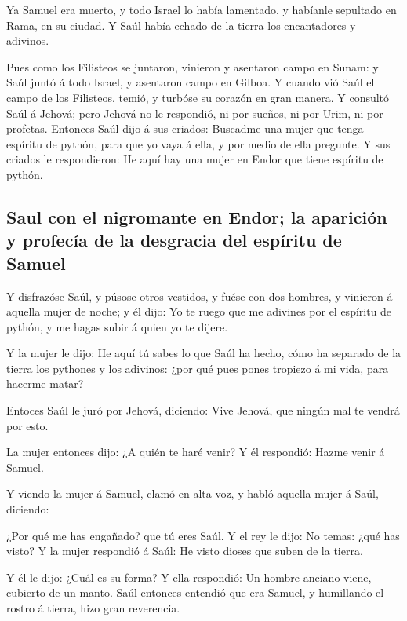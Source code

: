  Ya Samuel era muerto, y todo Israel lo había lamentado, y
habíanle sepultado en Rama, en su ciudad. Y Saúl había echado de la
tierra los encantadores y adivinos.

 Pues como los Filisteos se juntaron, vinieron y asentaron
campo en Sunam: y Saúl juntó á todo Israel, y asentaron campo en Gilboa.
 Y cuando vió Saúl el campo de los Filisteos, temió, y
turbóse su corazón en gran manera.  Y consultó Saúl á
Jehová; pero Jehová no le respondió, ni por sueños, ni por Urim, ni por
profetas.  Entonces Saúl dijo á sus criados: Buscadme una
mujer que tenga espíritu de pythón, para que yo vaya á ella, y por medio
de ella pregunte. Y sus criados le respondieron: He aquí hay una mujer
en Endor que tiene espíritu de pythón.

\hypertarget{saul-con-el-nigromante-en-endor-la-apariciuxf3n-y-profecuxeda-de-la-desgracia-del-espuxedritu-de-samuel}{%
\subsection{Saul con el nigromante en Endor; la aparición y profecía de
la desgracia del espíritu de
Samuel}\label{saul-con-el-nigromante-en-endor-la-apariciuxf3n-y-profecuxeda-de-la-desgracia-del-espuxedritu-de-samuel}}

 Y disfrazóse Saúl, y púsose otros vestidos, y fuése con
dos hombres, y vinieron á aquella mujer de noche; y él dijo: Yo te ruego
que me adivines por el espíritu de pythón, y me hagas subir á quien yo
te dijere.

 Y la mujer le dijo: He aquí tú sabes lo que Saúl ha
hecho, cómo ha separado de la tierra los pythones y los adivinos: ¿por
qué pues pones tropiezo á mi vida, para hacerme matar?

 Entoces Saúl le juró por Jehová, diciendo: Vive Jehová,
que ningún mal te vendrá por esto.

 La mujer entonces dijo: ¿A quién te haré venir? Y él
respondió: Hazme venir á Samuel.

 Y viendo la mujer á Samuel, clamó en alta voz, y habló
aquella mujer á Saúl, diciendo:

 ¿Por qué me has engañado? que tú eres Saúl. Y el rey le
dijo: No temas: ¿qué has visto? Y la mujer respondió á Saúl: He visto
dioses que suben de la tierra.

 Y él le dijo: ¿Cuál es su forma? Y ella respondió: Un
hombre anciano viene, cubierto de un manto. Saúl entonces entendió que
era Samuel, y humillando el rostro á tierra, hizo gran reverencia.

